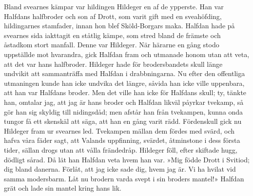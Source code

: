 Bland svearnes kämpar var hildingen Hildeger en af de ypperste. Han var
Halfdans halfbroder och son af Drott, som varit gift med en sveahöfding,
hildingarnes stamfader, innan hon blef Sköld-Borgars maka. Halfdan hade
på svearnes sida iakttagit en ståtlig kämpe, som stred bland de främste
och åstadkom stort manfall. Denne var Hildeger. När härarne en gång
stodo uppställde mot hvarandra, gick Halfdan fram och utmanade honom
utan att veta, att det var hans halfbroder. Hildeger hade för
brodersbandets skull länge undvikit att sammanträffa med Halfdan i
drabbningarna. Nu efter den offentliga utmaningen kunde han icke undvika
det längre, såvida han icke ville uppenbara, att han var Halfdans
broder. Men det ville han icke för Halfdans skull; ty, tänkte han,
omtalar jag, att jag är hans broder och Halfdan likväl påyrkar tvekamp,
så gör han sig skyldig till nidingsdåd; men afstår han från tvekampen,
kunna onda tungor få ett skenskäl att säga, att han en gång varit rädd.
Fördenskull gick nu Hildeger fram ur svearnes led. Tvekampen mällan dem
fördes med svärd, och hafva våra fäder sagt, att Valands uppfinning,
svärdet, åtminstone i dess första tider, sällan drogs
\protect\hypertarget{lb1625905.xhtmlux5cux23start116}{}{}\protect\hypertarget{lb1625905.xhtmlux5cux23start116-a}{}{}\protect\hypertarget{lb1625905.xhtmlux5cux23start116-b}{}{}\protect\hypertarget{lb1625905.xhtmlux5cux23start116-c}{}{}\protect\hypertarget{lb1625905.xhtmlux5cux23start116-d}{}{}
utan att vålla frändedråp. Hildeger föll, efter skiftade hugg, dödligt
sårad. Då lät han Halfdan veta hvem han var. »Mig födde Drott i Svitiod;
dig bland danerna. Förlåt, att jag icke sade dig, hvem jag är. Vi ha
hvilat vid samma modersbarm. Låt nu brodern varda svept i sin broders
mantel!» Halfdan grät och lade sin mantel kring hans lik.

